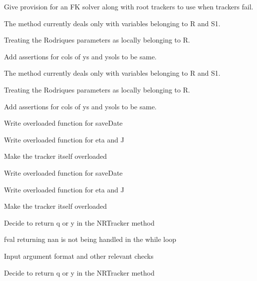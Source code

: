 \begin{DoxyRefList}
\label{todo__todo000009}%
%
Give provision for an FK solver along with root trackers to use when trackers fail.  
\item[Member \mbox{\hyperlink{classRootTracker_ae13e787a2ef083592f5c8d07ac4d08bc}{Root\+Tracker\+::NNTracker}} (Vector\+Xd ys, Matrix\+Xd ysols, int index)]\label{todo__todo000005}%
%
The method currently deals only with variables belonging to R and S1. 

Treating the Rodriques parameters as locally belonging to R. 

Add assertions for cols of ys and ysols to be same. 

\label{todo__todo000013}%
%
The method currently deals only with variables belonging to R and S1. 

Treating the Rodriques parameters as locally belonging to R. 

Add assertions for cols of ys and ysols to be same.  
\item[Member \mbox{\hyperlink{classRootTracker_a81f1227c2436cf1a84a7b8608b683bdd}{Root\+Tracker\+::NRCTracker}} (Vector\+Xcd x, Vector\+Xcd y, std\+::function$<$ Vector\+Xcd(\+Vector\+Xcd)$>$ f, std\+::function$<$ Matrix\+Xcd(\+Vector\+Xcd)$>$ Jfy, double eps=pow(10, -\/10))]\label{todo__todo000003}%
%
Write overloaded function for save\+Date 

Write overloaded function for eta and J 

Make the tracker itself overloaded 

\label{todo__todo000011}%
%
Write overloaded function for save\+Date 

Write overloaded function for eta and J 

Make the tracker itself overloaded  
\item[Member \mbox{\hyperlink{classRootTracker_a6bb3dcb73ea58ac44ab15d7803de3d5a}{Root\+Tracker\+::NRTracker}} (Vector\+Xd x, Vector\+Xd y, std\+::function$<$ Vector\+Xd(\+Vector\+Xd)$>$ f, std\+::function$<$ Matrix\+Xd(\+Vector\+Xd)$>$ Jfy, double eps=pow(10, -\/10))]\label{todo__todo000002}%
%
Decide to return q or y in the NRTracker method 

fval returning nan is not being handled in the while loop 

Input argument format and other relevant checks 

\label{todo__todo000010}%
%
Decide to return q or y in the NRTracker method 


\end{DoxyRefList}
